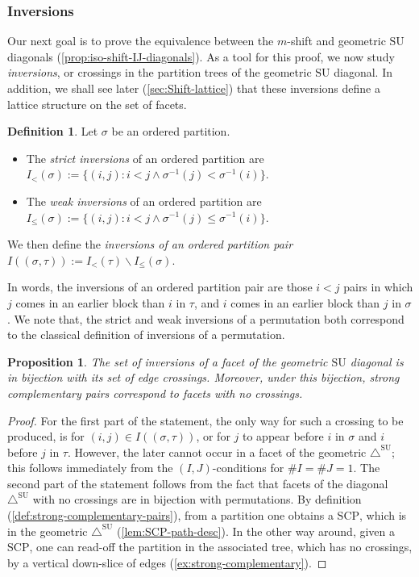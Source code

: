 \documentclass{amsart}
\newcommand{\darkblue}{\color{darkblue}} %
\newtheorem{proposition}[theorem]{Proposition}
\theoremstyle{definition}
\newtheorem{definition}[theorem]{Definition}
\newcommand{\ssm}{\smallsetminus} %
\newcommand{\card}[1]{\##1} %
\newcommand{\defn}[1]{\textsl{\darkblue #1}} %
\newcommand{\SU}{\mathrm{SU}}
\newcommand{\SUD}{\triangle^{\mathrm{SU}}}
\newcommand{\SCP}{\mathrm{SCP}}
\begin{document}

\subsubsection{Inversions}
\label{subsec:inversions}

Our next goal is to prove the equivalence between the $m$-shift and geometric $\SU$ diagonals (\cref{prop:iso-shift-IJ-diagonals}).
As a tool for this proof, we now study \emph{inversions}, or crossings in the partition trees of the geometric $\SU$ diagonal.
In addition, we shall see later (\cref{sec:Shift-lattice}) that these inversions define a lattice structure on the set of facets.

\begin{definition}
Let $\sigma$ be an ordered partition.
\begin{itemize}
    \item The \defn{strict inversions} of an ordered partition are $I_{<}(\sigma):= \{(i,j): i<j \land \sigma^{-1}(j)<\sigma^{-1}(i) \}$.
    \item The \defn{weak inversions} of an ordered partition are $I_{\leq}(\sigma):= \{(i,j): i<j \land \sigma^{-1}(j)\leq \sigma^{-1}(i) \}$.
\end{itemize}
We then define the \defn{inversions of an ordered partition pair} $I((\sigma,\tau)):=I_{<}(\tau)\ssm I_{\leq}(\sigma)$. 
\end{definition}
In words, the inversions of an ordered partition pair are those $i<j$ pairs in which $j$ comes in an earlier block than $i$ in $\tau$, and $i$ comes in an earlier block than $j$ in $\sigma$.
We note that, the strict and weak inversions of a permutation both correspond to the classical definition of inversions of a permutation.

\begin{proposition}
\label{p:crossings}
The set of inversions of a facet of the geometric $\SU$ diagonal is in bijection with its set of edge crossings. 
Moreover, under this bijection, strong complementary pairs correspond to facets with no crossings.
\end{proposition}

\begin{proof}
For the first part of the statement, the only way for such a crossing to be produced, is for $(i,j) \in I((\sigma,\tau))$, or for $j$ to appear before $i$ in $\sigma$ and $i$ before $j$ in $\tau$.
However, the later cannot occur in a facet of the geometric $\SUD$; this follows immediately from the $(I,J)$-conditions for $\card{I} = \card{J} = 1$. 
The second part of the statement follows from the fact that facets of the diagonal $\SUD$ with no crossings are in bijection with permutations.
By definition (\cref{def:strong-complementary-pairs}), from a partition one obtains a $\SCP$, which is in the geometric $\SUD$ (\cref{lem:SCP-path-desc}). 
In the other way around, given a $\SCP$, one can read-off the partition in the associated tree, which has no crossings, by a vertical down-slice of edges (\cref{ex:strong-complementary}).
\end{proof}
\end{document}
